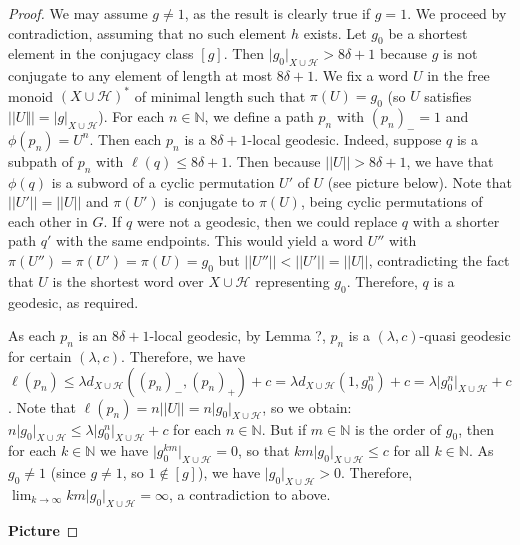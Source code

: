 \documentclass[12pt]{article}
\newcommand{\vs}{\vskip10pt}
\begin{document}
	\begin{proof}
		
		We may assume $g \neq 1$, as the result is clearly true if $g = 1$. We proceed by contradiction, assuming that no such element $h$ exists. Let $g_0$ be a shortest element in the conjugacy class $[g]$. Then $\vert g_0 \vert_{X \cup \mathcal{H}} > 8 \delta + 1$ because $g$ is not conjugate to any element of length at most $8 \delta + 1$. We fix a word $U$ in the free monoid $(X \cup \mathcal{H})^*$ of minimal length such that $\pi(U) = g_0$ (so $U$ satisfies $\vert \vert U \Vert \vert = \vert g \vert_{X \cup \mathcal{H}}$). For each $n \in \mathbb{N}$, we define a path $p_n$ with $(p_n)_- = 1$ and $\phi(p_n) = U^n$. Then each $p_n$ is a $8 \delta + 1$-local geodesic. Indeed, suppose $q$ is a subpath of $p_n$ with $\ell(q) \leq 8 \delta + 1$. Then because $\vert \vert U \vert \vert > 8 \delta + 1$, we have that $\phi(q)$ is a subword of a cyclic permutation $U'$ of $U$ (see picture below). Note that $\vert \vert U' \vert \vert = \vert \vert U \vert \vert $ and $\pi(U')$ is conjugate to $\pi(U)$, being cyclic permutations of each other in $G$. If $q$ were not a geodesic, then we could replace $q$ with a shorter path $q'$ with the same endpoints. This would yield a word $U''$ with $\pi(U'') = \pi(U') = \pi(U) = g_0$ but $\vert \vert U'' \vert \vert < \vert \vert U' \vert \vert = \vert \vert U \vert \vert$, contradicting the fact that $U$ is the shortest word over $X \cup \mathcal{H}$ representing $g_0$. Therefore, $q$ is a geodesic, as required. 
		
		\vs 
		
		As each $p_n$ is an $8 \delta +1$-local geodesic, by Lemma ?, $p_n$ is a $(\lambda, c)$-quasi geodesic for certain $(\lambda, c)$. Therefore, we have $\ell(p_n) \leq \lambda d_{X \cup \mathcal{H}}((p_n)_-, (p_n)_+) + c = \lambda d_{X \cup \mathcal{H}}(1, g_0^n) + c = \lambda \vert g_0^n \vert_{X \cup \mathcal{H}} + c$. Note that $\ell(p_n) = n \vert \vert U \vert \vert = n \vert g_0 \vert_{X \cup \mathcal{H}}$, so we obtain: $n \vert g_0 \vert_{X \cup \mathcal{H}} \leq \lambda \vert g_0^n \vert_{X \cup \mathcal{H}} + c$ for each $n \in \mathbb{N}$. But if $m \in \mathbb{N}$ is the order of $g_0$, then for each $k \in \mathbb{N}$ we have $\vert g_0^{km} \vert_{X \cup \mathcal{H}} = 0$, so that $km \vert g_0 \vert_{X \cup \mathcal{H}} \leq c$ for all $k \in \mathbb{N}$. As $g_0 \neq 1$ (since $g \neq 1$, so $1 \notin [g]$), we have $\vert g_0 \vert_{X \cup \mathcal{H}} > 0$. Therefore, $\lim_{k \rightarrow \infty} km \vert g_0 \vert_{X \cup \mathcal{H}} = \infty$, a contradiction to above. 
		
		\textbf{Picture}
		
	\end{proof}
	
\end{document}

